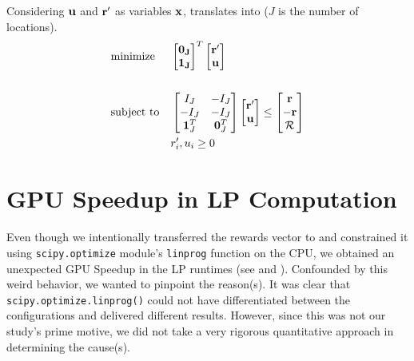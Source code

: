 Considering $\mathbf{u}$ and $\mathbf{r'}$ as variables $\mathbf{x}$,  translates into  ($J$ is the number of locations).
\begin{equation} \label{eqn:lp_matrix_rewards}
\begin{aligned}
& \text{minimize}
& & \begin{bmatrix}
\mathbf{0_J}\\
\mathbf{1_J}\\
\end{bmatrix}^T
\begin{bmatrix}
\mathbf{r'}\\
\mathbf{u}
\end{bmatrix}\\ \\
& \text{subject to}
& & \begin{bmatrix}
I_J & -I_J\\
-I_J & -I_J\\
\mathbf{1}^T_J & \mathbf{0}^T_J\\
\end{bmatrix}
\begin{bmatrix}
\mathbf{r'}\\
\mathbf{u}\\
\end{bmatrix} \leq
\begin{bmatrix}
\mathbf{r}\\
-\mathbf{r}\\
\mathcal{R}\\
\end{bmatrix}\\
&&& r'_i, u_i \geq 0
\end{aligned}
\end{equation}

\chapter{GPU Speedup in LP Computation} \label{app:GPU Speedup in LP Computation}
Even though we intentionally transferred the rewards vector to and constrained it using \texttt{scipy.optimize} module's \texttt{linprog} function on the CPU, we obtained an unexpected GPU Speedup in the LP runtimes (see  and ). Confounded by this weird behavior, we wanted to pinpoint the reason(s). It was clear that \texttt{scipy.optimize.linprog()} could not have differentiated between the configurations and delivered different results. However, since this was not our study's prime motive, we did not take a very rigorous quantitative approach in determining the cause(s).

